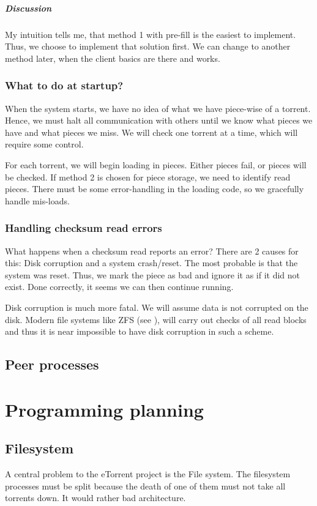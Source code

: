 \documentclass[a4paper]{report}
\begin{document}
\paragraph{Discussion}
My intuition tells me, that method 1 with pre-fill is the easiest to
implement. Thus, we choose to implement that solution first. We can
change to another method later, when the client basics are there and
works.

\subsection{What to do at startup?}
When the system starts, we have no idea of what we have piece-wise of
a torrent. Hence, we must halt all communication with others until we
know what pieces we have and what pieces we miss. We will check one
torrent at a time, which will require some control.

For each torrent, we will begin loading in pieces. Either pieces fail,
or pieces will be checked. If method 2 is chosen for piece storage, we
need to identify read pieces. There must be some error-handling in the
loading code, so we gracefully handle mis-loads.

\subsection{Handling checksum read errors}
What happens when a checksum read reports an error? There are 2 causes
for this: Disk corruption and a system crash/reset. The most probable
is that the system was reset. Thus, we mark the piece as bad and
ignore it as if it did not exist. Done correctly, it seems we can then
continue running.

Disk corruption is much more fatal. We will assume data is not
corrupted on the disk. Modern file systems like ZFS (see \cite{zfs}),
will carry out checks of all read blocks and thus it is near
impossible to have disk corruption in such a scheme.

\section{Peer processes}
\chapter{Programming planning}
\section{Filesystem}
A central problem to the eTorrent project is the File system. The
filesystem processes must be split because the death of one of them
must not take all torrents down. It would rather bad architecture.
\end{document}
